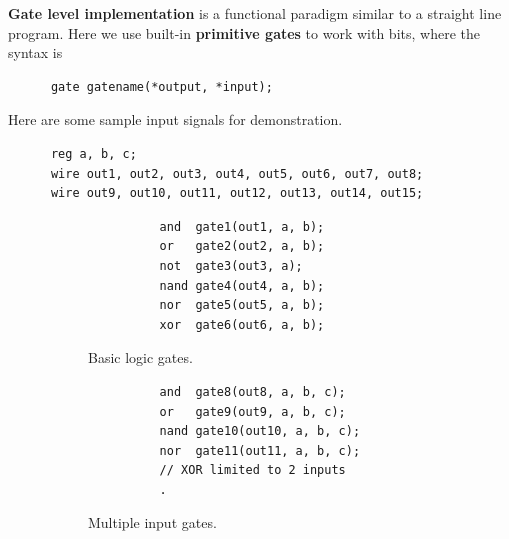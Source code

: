   \begin{definition}
    \label{def:gate-level-implementation}
    \textbf{Gate level implementation} is a functional paradigm similar to a straight line program. Here we use built-in \textbf{primitive gates} to work with bits, where the syntax is 
    \begin{lstlisting}
      gate gatename(*output, *input);
    \end{lstlisting}

    Here are some sample input signals for demonstration.
    \begin{lstlisting}
      reg a, b, c;
      wire out1, out2, out3, out4, out5, out6, out7, out8;
      wire out9, out10, out11, out12, out13, out14, out15; 
    \end{lstlisting}

    \begin{figure}[H]
      \centering
      \begin{subfigure}[b]{0.48\textwidth}
        \centering
        \begin{lstlisting}
          and  gate1(out1, a, b);
          or   gate2(out2, a, b);
          not  gate3(out3, a);   
          nand gate4(out4, a, b);
          nor  gate5(out5, a, b);
          xor  gate6(out6, a, b);
        \end{lstlisting}
        \caption{Basic logic gates.}
      \end{subfigure}
      \hfill 
      \begin{subfigure}[b]{0.48\textwidth}
        \centering
        \begin{lstlisting}
          and  gate8(out8, a, b, c);   
          or   gate9(out9, a, b, c);   
          nand gate10(out10, a, b, c); 
          nor  gate11(out11, a, b, c); 
          // XOR limited to 2 inputs
          .
        \end{lstlisting}
        \caption{Multiple input gates.}
      \end{subfigure}
      \caption{}
    \end{figure}
  \end{definition}

